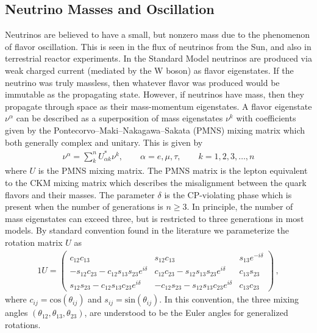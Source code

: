 \documentclass[universe,article,submit,moreauthors,pdftex,a4paper]{Definitions/mdpi}
\begin{document}
\subsection{Neutrino Masses and Oscillation} \label{sec:Neutrinos}
\noindent Neutrinos are believed to have a small, but nonzero mass due to the phenomenon of flavor oscillation. This is seen in the flux of neutrinos from the Sun, and also in terrestrial reactor experiments. In the Standard Model neutrinos are produced via weak charged current (mediated by the W boson) as flavor eigenstates. If the neutrino was truly massless, then whatever flavor was produced would be immutable as the propagating state. However, if neutrinos have mass, then they propagate through space as their mass-momentum eigenstates. A flavor eigenstate $\nu^{\alpha}$ can be described as a superposition of mass eigenstates $\nu^{k}$ with coefficients given by the Pontecorvo–Maki–Nakagawa–Sakata (PMNS) mixing matrix which both generally complex and unitary. This is given by
\begin{align}\label{NuFlavors}
	\nu^{\alpha}=\sum_k^nU^\ast_{\alpha k}\nu^{k}, \qquad\alpha=e,\mu,\tau,\qquad k=1,2,3,\dots,n
\end{align}
where $U$ is the PMNS mixing matrix. The PMNS matrix is the lepton equivalent to the CKM mixing matrix which describes the misalignment between the quark flavors and their masses. The parameter $\delta$ is the CP-violating phase which is present when the number of generations is $n\geq3$. In principle, the number of mass eigenstates can exceed three, but is restricted to three generations in most models. By standard convention found in the literature we parameterize the rotation matrix $U$ as
	\begin{alignat}{1}
  	\label{PMNS} U =
		\begin{pmatrix}
			c_{12}c_{13} & s_{12}c_{13} & s_{13}e^{-i\delta}\\
			-s_{12}c_{23} - c_{12}s_{13}s_{23}e^{i\delta} & c_{12}c_{23} - s_{12}s_{13}s_{23}e^{i\delta} & c_{13}s_{23}\\
			s_{12}s_{23} - c_{12}s_{13}c_{23}e^{i\delta}& -c_{12}s_{23} - s_{12}s_{13}c_{23}e^{i\delta} & c_{13}c_{23}
		\end{pmatrix}\,,
	\end{alignat}
where $c_{ij} = \mathrm{cos}(\theta_{ij})$ and $s_{ij} = \mathrm{sin}(\theta_{ij})$. In this convention, the three mixing angles $(\theta_{12}, \theta_{13}, \theta_{23})$, are understood to be the Euler angles for generalized rotations.
\end{document}
